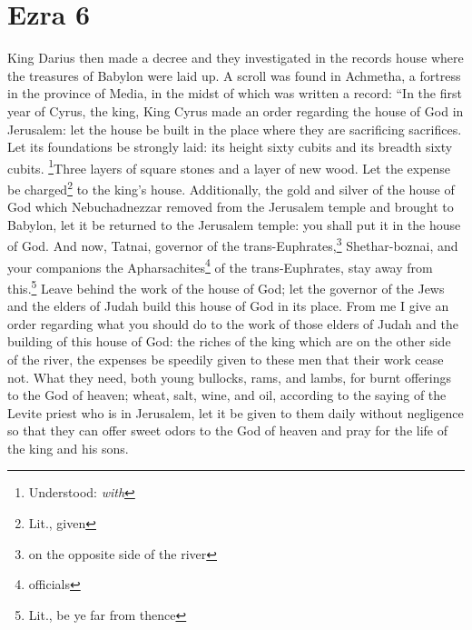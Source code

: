 \section{Ezra 6}\label{Ezra 6}
\begin{enumerate}
     King Darius then made a decree and they investigated in the records house where the treasures of Babylon were laid up.%
     A scroll was found in Achmetha, a fortress in the province of Media, in the midst of which was written a record:%
     ``In the first year of Cyrus, the king, King Cyrus made an order regarding the house of God in Jerusalem: let the house be built in the place where they are sacrificing sacrifices. Let its foundations be strongly laid: its height sixty cubits and its breadth sixty cubits.%
     \footnote{Understood: \emph{with}}Three layers of square stones and a layer of new wood. Let the expense be charged\footnote{Lit., given} to the king's house.%
     Additionally, the gold and silver of the house of God which Nebuchadnezzar removed from the Jerusalem temple and brought to Babylon, let it be returned to the Jerusalem temple: you shall put it in the house of God.%
     And now, Tatnai, governor of the trans-Euphrates,\footnote{on the opposite side of the river} Shethar-boznai, and your companions the Apharsachites\footnote{officials} of the trans-Euphrates, stay away from this.\footnote{Lit., be ye far from thence}%
     Leave behind the work of the house of God; let the governor of the Jews and the elders of Judah build this house of God in its place.%
     From me I give an order regarding what you should do to the work of those elders of Judah and the building of this house of God: the riches of the king which are on the other side of the river, the expenses be speedily given to these men that their work cease not.%
     What they need, both young bullocks, rams, and lambs, for burnt offerings to the God of heaven; wheat, salt, wine, and oil, according to the saying of the Levite priest who is in Jerusalem, let it be given to them daily without negligence%
     so that they can offer sweet odors to the God of heaven and pray for the life of the king and his sons.%

\end{enumerate}
